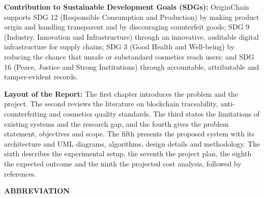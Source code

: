 \documentclass[12pt,a4paper]{report}
\begin{document}
{\vspace{0.25cm}
\noindent \textbf{Contribution to Sustainable Development Goals (SDGs):} OriginChain supports SDG 12 (Responsible Consumption and Production) by making product origin and handling transparent and by discouraging counterfeit goods; SDG 9 (Industry, Innovation and Infrastructure) through an innovative, auditable digital infrastructure for supply chains; SDG 3 (Good Health and Well-being) by reducing the chance that unsafe or substandard cosmetics reach users; and SDG 16 (Peace, Justice and Strong Institutions) through accountable, attributable and tamper-evident records.

\vspace{0.25cm}
\noindent \textbf{Layout of the Report:} The first chapter introduces the problem and the project. The second reviews the literature on blockchain traceability, anti-counterfeiting and cosmetics quality standards. The third states the limitations of existing systems and the research gap, and the fourth gives the problem statement, objectives and scope. The fifth presents the proposed system with its architecture and UML diagrams, algorithms, design details and methodology. The sixth describes the experimental setup, the seventh the project plan, the eighth the expected outcome and the ninth the projected cost analysis, followed by references.
\par}

\newpage
\tableofcontents

\newpage
\listoffigures
\vspace{0.8cm}
\listoftables

\newpage
\thispagestyle{plain}
\begin{center}
    \vspace*{0.2cm}
    {\fontsize{16pt}{20pt}\selectfont \textbf{ABBREVIATION}\par}
\end{center}
\vspace{0.6cm}
\end{document}
